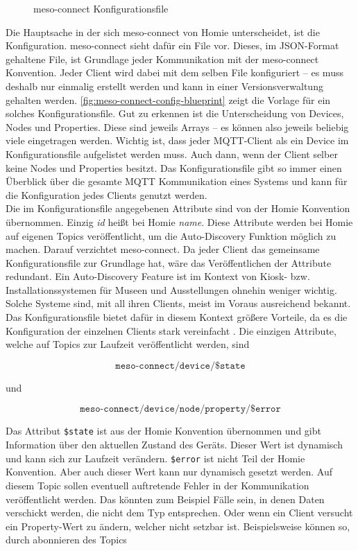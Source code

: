 \begin{figure}
  
  \caption{meso-connect Konfigurationsfile}
  \label{fig:meso-connect-config-blueprint}
\end{figure}

Die Hauptsache in der sich meso-connect von Homie unterscheidet, ist die Konfiguration. meso-connect
sieht dafür ein File vor. Dieses, im JSON-Format gehaltene File, ist Grundlage jeder Kommunikation
mit der meso-connect Konvention. Jeder Client wird dabei mit dem selben File konfiguriert -- es muss 
deshalb nur einmalig erstellt werden und kann in einer Versionsverwaltung gehalten werden. 
\autoref{fig:meso-connect-config-blueprint} zeigt die Vorlage für ein solches Konfigurationsfile. 
Gut zu erkennen ist die Unterscheidung von Devices, Nodes und Properties. Diese sind jeweils Arrays --
es können also jeweils beliebig viele eingetragen werden. Wichtig ist, dass jeder MQTT-Client als ein
Device im Konfigurationsfile aufgelistet werden muss. Auch dann, wenn der Client selber 
keine Nodes und Properties besitzt. Das Konfigurationsfile gibt so immer einen Überblick über die 
gesamte MQTT Kommunikation eines Systems und kann für die Konfiguration jedes Clients genutzt werden.\\
Die im Konfigurationsfile angegebenen Attribute sind von der Homie Konvention übernommen. Einzig \emph{id} heißt
bei Homie \emph{name}. Diese Attribute werden bei Homie auf eigenen Topics veröffentlicht, um die 
Auto-Discovery Funktion möglich zu machen. Darauf verzichtet meso-connect. Da jeder Client das gemeinsame
Konfigurationsfile zur Grundlage hat, wäre das Veröffentlichen der Attribute redundant. Ein Auto-Discovery
Feature ist im Kontext von Kiosk- bzw. Installationssystemen für Museen und Ausstellungen ohnehin weniger wichtig.
Solche Systeme sind, mit all ihren Clients, meist im Voraus ausreichend bekannt. Das Konfigurationsfile
bietet dafür in diesem Kontext größere Vorteile, da es die Konfiguration der einzelnen Clients stark
vereinfacht . Die einzigen Attribute, welche auf Topics zur Laufzeit veröffentlicht 
werden, sind

\[\texttt{meso-connect/device/\$state} \]

und

\[\texttt{meso-connect/device/node/property/\$error} \]

Das Attribut \texttt{\$state} ist aus der Homie Konvention übernommen und gibt Information über den aktuellen
Zustand des Geräts. Dieser Wert ist dynamisch und kann sich zur Laufzeit verändern. \texttt{\$error} ist nicht 
Teil der Homie Konvention. Aber auch dieser Wert kann nur dynamisch gesetzt werden.
Auf diesem Topic sollen eventuell auftretende Fehler in der Kommunikation veröffentlicht
werden. Das könnten zum Beispiel Fälle sein, in denen Daten verschickt werden, die nicht dem Typ entsprechen.
Oder wenn ein Client versucht ein Property-Wert zu ändern, welcher nicht setzbar ist. Beispielsweise können so,
durch abonnieren des Topics


